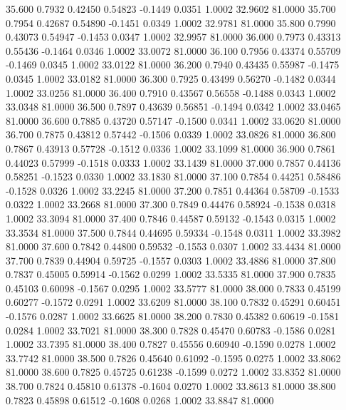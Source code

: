   35.600   0.7932   0.42450   0.54823  -0.1449   0.0351   1.0002  32.9602  81.0000
  35.700   0.7954   0.42687   0.54890  -0.1451   0.0349   1.0002  32.9781  81.0000
  35.800   0.7990   0.43073   0.54947  -0.1453   0.0347   1.0002  32.9957  81.0000
  36.000   0.7973   0.43313   0.55436  -0.1464   0.0346   1.0002  33.0072  81.0000
  36.100   0.7956   0.43374   0.55709  -0.1469   0.0345   1.0002  33.0122  81.0000
  36.200   0.7940   0.43435   0.55987  -0.1475   0.0345   1.0002  33.0182  81.0000
  36.300   0.7925   0.43499   0.56270  -0.1482   0.0344   1.0002  33.0256  81.0000
  36.400   0.7910   0.43567   0.56558  -0.1488   0.0343   1.0002  33.0348  81.0000
  36.500   0.7897   0.43639   0.56851  -0.1494   0.0342   1.0002  33.0465  81.0000
  36.600   0.7885   0.43720   0.57147  -0.1500   0.0341   1.0002  33.0620  81.0000
  36.700   0.7875   0.43812   0.57442  -0.1506   0.0339   1.0002  33.0826  81.0000
  36.800   0.7867   0.43913   0.57728  -0.1512   0.0336   1.0002  33.1099  81.0000
  36.900   0.7861   0.44023   0.57999  -0.1518   0.0333   1.0002  33.1439  81.0000
  37.000   0.7857   0.44136   0.58251  -0.1523   0.0330   1.0002  33.1830  81.0000
  37.100   0.7854   0.44251   0.58486  -0.1528   0.0326   1.0002  33.2245  81.0000
  37.200   0.7851   0.44364   0.58709  -0.1533   0.0322   1.0002  33.2668  81.0000
  37.300   0.7849   0.44476   0.58924  -0.1538   0.0318   1.0002  33.3094  81.0000
  37.400   0.7846   0.44587   0.59132  -0.1543   0.0315   1.0002  33.3534  81.0000
  37.500   0.7844   0.44695   0.59334  -0.1548   0.0311   1.0002  33.3982  81.0000
  37.600   0.7842   0.44800   0.59532  -0.1553   0.0307   1.0002  33.4434  81.0000
  37.700   0.7839   0.44904   0.59725  -0.1557   0.0303   1.0002  33.4886  81.0000
  37.800   0.7837   0.45005   0.59914  -0.1562   0.0299   1.0002  33.5335  81.0000
  37.900   0.7835   0.45103   0.60098  -0.1567   0.0295   1.0002  33.5777  81.0000
  38.000   0.7833   0.45199   0.60277  -0.1572   0.0291   1.0002  33.6209  81.0000
  38.100   0.7832   0.45291   0.60451  -0.1576   0.0287   1.0002  33.6625  81.0000
  38.200   0.7830   0.45382   0.60619  -0.1581   0.0284   1.0002  33.7021  81.0000
  38.300   0.7828   0.45470   0.60783  -0.1586   0.0281   1.0002  33.7395  81.0000
  38.400   0.7827   0.45556   0.60940  -0.1590   0.0278   1.0002  33.7742  81.0000
  38.500   0.7826   0.45640   0.61092  -0.1595   0.0275   1.0002  33.8062  81.0000
  38.600   0.7825   0.45725   0.61238  -0.1599   0.0272   1.0002  33.8352  81.0000
  38.700   0.7824   0.45810   0.61378  -0.1604   0.0270   1.0002  33.8613  81.0000
  38.800   0.7823   0.45898   0.61512  -0.1608   0.0268   1.0002  33.8847  81.0000
